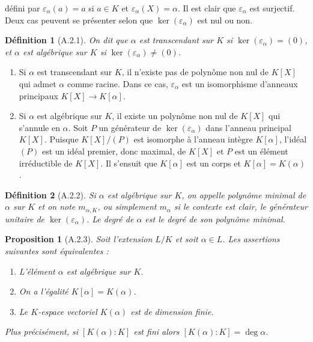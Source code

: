 \documentclass[12pts,a4paper]{report}
\newtheorem{definition}{Définition}
\newtheorem{proposition}{Proposition}
\begin{document}
défini par \( \varepsilon_\alpha (a) = a \) si \( a \in K \) et \( \varepsilon_\alpha (X) = \alpha \). Il est clair que \( \varepsilon_\alpha \) est surjectif. Deux cas peuvent se présenter selon que \( \ker (\varepsilon_\alpha) \) est nul ou non.

\begin{definition}[A.2.1]
On dit que \( \alpha \) est transcendant sur \( K \) si \( \ker (\varepsilon_\alpha) = (0) \), et \( \alpha \) est algébrique sur \( K \) si \( \ker (\varepsilon_\alpha) \neq (0) \).
\end{definition}

\begin{enumerate}[label=(\alph*)]
\item Si \( \alpha \) est transcendant sur \( K \), il n'existe pas de polynôme non nul de \( K[X] \) qui admet \( \alpha \) comme racine. Dans ce cas, \( \varepsilon_\alpha \) est un isomorphisme d'anneaux principaux \( K[X] \longrightarrow K[\alpha] \).

\item Si \( \alpha \) est algébrique sur \( K \), il existe un polynôme non nul de \( K[X] \) qui s'annule en \( \alpha \). Soit \( P \) un générateur de \( \ker (\varepsilon_\alpha) \) dans l'anneau principal \( K[X] \). Puisque \( K[X] / (P) \) est isomorphe à l'anneau intègre \( K[\alpha] \), l'idéal \( (P) \) est un idéal premier, donc maximal, de \( K[X] \) et \( P \) est un élément irréductible de \( K[X] \). Il s'ensuit que \( K[\alpha] \) est un corps et \( K[\alpha] = K(\alpha) \).
\end{enumerate}

\begin{definition}[A.2.2]
Si \( \alpha \) est algébrique sur \( K \), on appelle polynôme minimal de \( \alpha \) sur \( K \) et on note \( m_{\alpha, K} \), ou simplement \( m_\alpha \) si le contexte est clair, le générateur unitaire de \( \ker (\varepsilon_\alpha) \). Le degré de \( \alpha \) est le degré de son polynôme minimal.
\end{definition}

\begin{proposition}[A.2.3]
Soit l'extension \( L/K \) et soit \( \alpha \in L \). Les assertions suivantes sont équivalentes :
\begin{enumerate}[label=(\alph*)]
\item L'élément \( \alpha \) est algébrique sur \( K \).
\item On a l'égalité \( K[\alpha] = K(\alpha) \).
\item Le \( K \)-espace vectoriel \( K(\alpha) \) est de dimension finie.
\end{enumerate}
Plus précisément, si \( [K(\alpha) : K] \) est fini alors \( [K(\alpha) : K] = \deg \alpha \).
\end{proposition}
\end{document}
